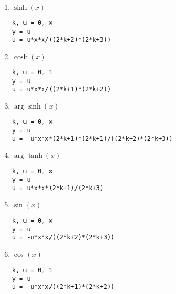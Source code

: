 \documentclass[11pt,a4paper]{article}
\begin{document}
\begin{enumerate}
\item $\displaystyle\sinh(x)$
\hfill
\begin{minipage}[t]{9cm}\footnotesize
\begin{Verbatim}
k, u = 0, x
y = u
u = u*x*x/((2*k+2)*(2*k+3))
\end{Verbatim}
\end{minipage}
\vspace*{3mm}


\item $\displaystyle\cosh(x)$
\hfill
\begin{minipage}[t]{9cm}\footnotesize
\begin{Verbatim}
k, u = 0, 1
y = u
u = u*x*x/((2*k+1)*(2*k+2))
\end{Verbatim}
\end{minipage}
\vspace*{3mm}


\item $\displaystyle\arg\sinh(x)$  
\hfill
\begin{minipage}[t]{9cm}\footnotesize
\begin{Verbatim}
k, u = 0, x
y = u
u = -u*x*x*(2*k+1)*(2*k+1)/((2*k+2)*(2*k+3))
\end{Verbatim}
\end{minipage}
\vspace*{3mm}


\item $\displaystyle\arg\tanh(x)$  	
\hfill
\begin{minipage}[t]{9cm}\footnotesize
\begin{Verbatim}
k, u = 0, x
y = u
u = u*x*x*(2*k+1)/(2*k+3)
\end{Verbatim}
\end{minipage}
\vspace*{3mm}

\item $\displaystyle\sin(x)$
\hfill
\begin{minipage}[t]{9cm}\footnotesize
\begin{Verbatim}
k, u = 0, x
y = u
u = -u*x*x/((2*k+2)*(2*k+3))
\end{Verbatim}
\end{minipage}
\vspace*{3mm}

\item $\displaystyle\cos(x)$
\hfill
\begin{minipage}[t]{9cm}\footnotesize
\begin{Verbatim}
k, u = 0, 1
y = u
u = -u*x*x/((2*k+1)*(2*k+2))
\end{Verbatim}
\end{minipage}
\vspace*{3mm}

\end{enumerate}

\end{document}
